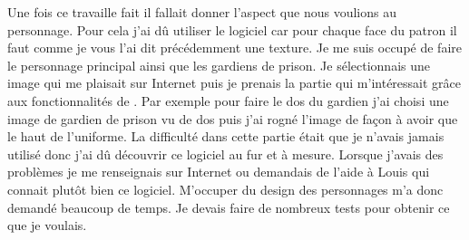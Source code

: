\documentclass{article}
\begin{document}
\par
Une fois ce travaille fait il fallait donner l’aspect que nous voulions au personnage. Pour cela j’ai dû utiliser le logiciel  car pour chaque face du patron il faut comme je vous l’ai dit précédemment une texture. Je me suis occupé de faire le personnage principal ainsi que les gardiens de prison. Je sélectionnais une image qui me plaisait sur Internet puis je prenais la partie qui m’intéressait grâce aux fonctionnalités de . Par exemple pour faire le dos du gardien j’ai choisi une image de gardien de prison vu de dos puis j’ai rogné l’image de façon à avoir que le haut de l’uniforme. La difficulté dans cette partie était que je n’avais jamais utilisé  donc j’ai dû  découvrir ce logiciel au fur et à mesure. Lorsque j’avais des problèmes je me renseignais sur Internet ou demandais de l’aide à Louis qui connait plutôt bien ce logiciel. M’occuper du design des personnages m’a donc demandé beaucoup de temps. Je devais faire de nombreux tests pour obtenir ce que je voulais.    
\newline
\end{document}

